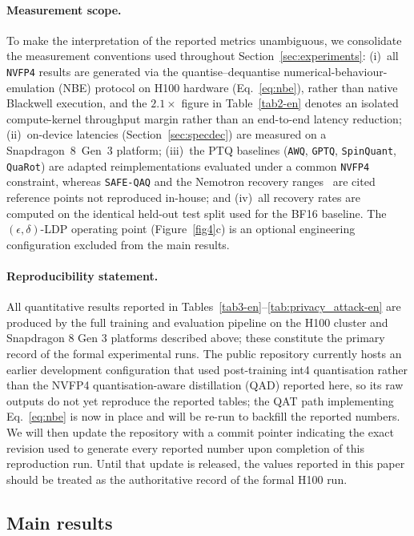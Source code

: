 \documentclass[a4paper,fleqn]{cas-sc}
\begin{document}
\paragraph{Measurement scope.} To make the interpretation of the reported metrics unambiguous, we consolidate the measurement conventions used throughout Section~\ref{sec:experiments}: (i)~all \texttt{NVFP4} results are generated via the quantise--dequantise numerical-behaviour-emulation (NBE) protocol on H100 hardware (Eq.~\eqref{eq:nbe}), rather than native Blackwell execution, and the $2.1\times$ figure in Table~\ref{tab2-en} denotes an isolated compute-kernel throughput margin rather than an end-to-end latency reduction; (ii)~on-device latencies (Section~\ref{sec:specdec}) are measured on a Snapdragon~8~Gen~3 platform; (iii)~the PTQ baselines (\texttt{AWQ}, \texttt{GPTQ}, \texttt{SpinQuant}, \texttt{QuaRot}) are adapted reimplementations evaluated under a common \texttt{NVFP4} constraint, whereas \texttt{SAFE-QAQ} and the Nemotron recovery ranges~\citep{3} are cited reference points not reproduced in-house; and (iv)~all recovery rates are computed on the identical held-out test split used for the BF16 baseline. The $(\epsilon,\delta)$-LDP operating point (Figure~\ref{fig4}c) is an optional engineering configuration excluded from the main results.

\paragraph{Reproducibility statement.} All quantitative results reported in Tables~\ref{tab3-en}--\ref{tab:privacy_attack-en} are produced by the full training and evaluation pipeline on the H100 cluster and Snapdragon 8 Gen 3 platforms described above; these constitute the primary record of the formal experimental runs. The public repository currently hosts an earlier development configuration that used post-training int4 quantisation rather than the NVFP4 quantisation-aware distillation (QAD) reported here, so its raw outputs do not yet reproduce the reported tables; the QAT path implementing Eq.~\eqref{eq:nbe} is now in place and will be re-run to backfill the reported numbers. We will then update the repository with a commit pointer indicating the exact revision used to generate every reported number upon completion of this reproduction run. Until that update is released, the values reported in this paper should be treated as the authoritative record of the formal H100 run.

\subsection{Main results}\label{sec:main-results}
\end{document}
